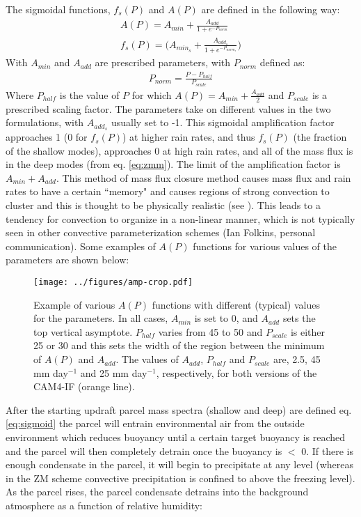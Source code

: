 \documentclass[letterpaper,12pt,titlepage,oneside,final]{book}
\begin{document}
The sigmoidal functions, $f_{s}(P)$ and $A(P)$ are defined in the following way:
\begin{align}\label{eq:sigmoid}
A(P)=A_{min}+\frac{A_{add}}{1+e^{-P_{norm}}}
\\
f_{s}(P)=\Big(A_{min_{s}}+\frac{A_{add_{s}}}{1+e^{-P_{norm_{s}}}}\Big)
\end{align}
With $A_{min}$ and $A_{add}$ are prescribed parameters, with $P_{norm}$ defined as:
\begin{align}
P_{norm}=\frac{P-P_{half}}{P_{scale}}
\end{align}
Where $P_{half}$ is the value of $P$ for which $A(P) = A_{min} + \frac{A_{add}}{2}$ and $P_{scale}$ is a prescribed scaling factor. The parameters take on different values in the two formulations, with $A_{add_{s}}$ usually set to -1. This sigmoidal amplification factor approaches 1 (0 for $f_{s}(P)$) at higher rain rates, and thus $f_{s}(P)$ (the fraction of the shallow modes), approaches 0 at high rain rates, and all of the mass flux is in the deep modes (from eq. \ref{eq:zmm}). The limit of the amplification factor is $A_{min} + A_{add}$. This method of mass flux closure method causes mass flux and rain rates to have a certain ``memory" and causes regions of strong convection to cluster and this is thought to be physically realistic (see \cite{mapes_gregarious_1993}). This leads to a tendency for convection to organize in a non-linear manner, which is not typically seen in other convective parameterization schemes (Ian Folkins, personal communication). Some examples of $A(P)$ functions for various values of the parameters are shown below:
\begin{figure}[H]
\centering
\noindent\texttt{[image: ../figures/amp-crop.pdf]}\hfill
\caption{Example of various $A(P)$ functions with different (typical) values for the parameters. In all cases, $A_{min}$ is set to 0, and $A_{add}$ sets the top vertical asymptote. $P_{half}$ varies from 45 to 50 and $P_{scale}$ is either 25 or 30 and this sets the width of the region between the minimum of $A(P)$ and $A_{add}$. The values of $A_{add}$, $P_{half}$ and $P_{scale}$ are, 2.5, 45 mm day$^{-1}$ and 25 mm day$^{-1}$, respectively, for both versions of the CAM4-IF (orange line).}
\label{fig:sigmoid}
\end{figure}
After the starting updraft parcel mass spectra (shallow and deep) are defined eq. \ref{eq:sigmoid} the parcel will entrain environmental air from the outside environment which reduces buoyancy until a certain target buoyancy is reached and the parcel will then completely detrain once the buoyancy is $<$ 0. If there is enough condensate in the parcel, it will begin to precipitate at any level (whereas in the ZM scheme convective precipitation is confined to above the freezing level). As the parcel rises, the parcel condensate detrains into the background atmosphere as a function of relative humidity:
\end{document}
